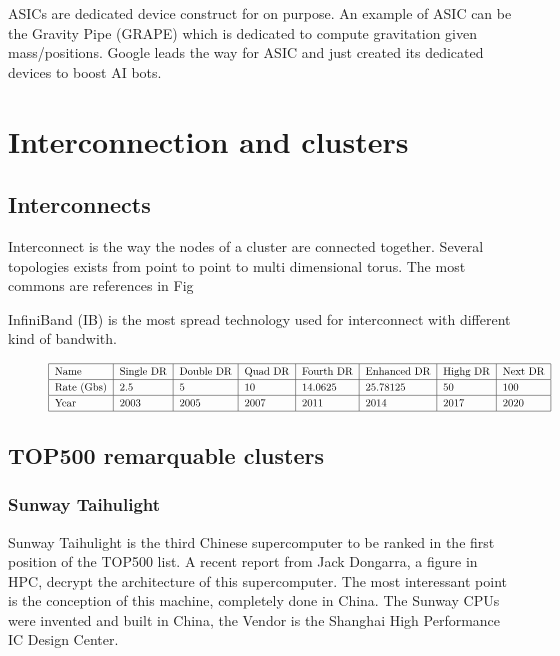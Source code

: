 ASICs are dedicated device construct for on purpose. 
An example of ASIC can be the Gravity Pipe (GRAPE) which is dedicated to compute gravitation given mass/positions.
Google leads the way for ASIC and just created its dedicated devices to boost AI bots. 

\section{Interconnection and clusters}

\subsection{Interconnects}
Interconnect is the way the nodes of a cluster are connected together. 
Several topologies exists from point to point to multi dimensional torus.
The most commons are references in Fig

InfiniBand (IB) is the most spread technology used for interconnect with different kind of bandwith.
\begin{figure}
\begin{center}
\[\arraycolsep=0.pt\def\arraystretch{1.2}
\begin{tabular}{| l | l | l | l | l | l | l | l |}
\hline
Name & Single DR & Double DR & Quad DR & Fourth DR & Enhanced DR & Highg DR & Next DR \\
\hline
Rate (Gbs) & 2.5 & 5 & 10 & 14.0625 & 25.78125 & 50 & 100 \\
\hline
Year & 2003 & 2005 & 2007 & 2011 & 2014 & 2017 & 2020 \\
\hline
\end{tabular}
\]
\end{center}
\end{figure}


\subsection{TOP500 remarquable clusters}
\subsubsection{Sunway Taihulight}

Sunway Taihulight is the third Chinese supercomputer to be ranked in the first position of the TOP500 list. 
A recent report from Jack Dongarra, a figure in HPC, decrypt the architecture of this supercomputer\cite{dongarra2016report}. 
The most interessant point is the conception of this machine, completely done in China. 
The Sunway CPUs were invented and built in China, the Vendor is the Shanghai High Performance IC Design Center. 

